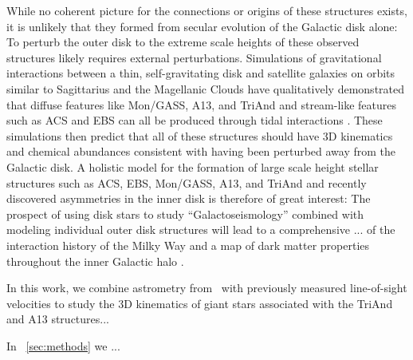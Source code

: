 \documentclass[modern]{aastex62}
\newcommand{\gaia}{\project{Gaia}}
\begin{document}
While no coherent picture for the connections or origins of these structures
exists, it is unlikely that they formed from secular evolution of the Galactic
disk alone:
To perturb the outer disk to the extreme scale heights of these observed
structures likely requires external perturbations.
Simulations of gravitational interactions between a thin, self-gravitating disk
and satellite galaxies on orbits similar to Sagittarius and the Magellanic
Clouds have qualitatively demonstrated that diffuse features like Mon/GASS, A13,
and TriAnd and stream-like features such as ACS and EBS can all be produced
through tidal interactions \citep{Purcell:2011, Price-Whelan:2015, Gomez:2016,
Laporte:2018, Laporte:2018a}.
These simulations then predict that all of these structures should have 3D
kinematics and chemical abundances consistent with having been perturbed away
from the Galactic disk.
A holistic model for the formation of large scale height stellar structures such
as ACS, EBS, Mon/GASS, A13, and TriAnd and recently discovered asymmetries in
the inner disk \citep[e.g.,][]{Widrow:2012, Antoja:2018} is therefore of great
interest:
The prospect of using disk stars to study ``Galactoseismology'' combined with
modeling individual outer disk structures will lead to a comprehensive ... of
the interaction history of the Milky Way and a map of dark matter properties
throughout the inner Galactic halo \citep[e.g.,][]{Widrow:2012, Laporte:2018b}.

In this work, we combine astrometry from \gaia\ with previously measured
line-of-sight velocities to study the 3D kinematics of giant stars associated
with the TriAnd and A13 structures...


In \sectionname~\ref{sec:methods} we ...

\end{document}
